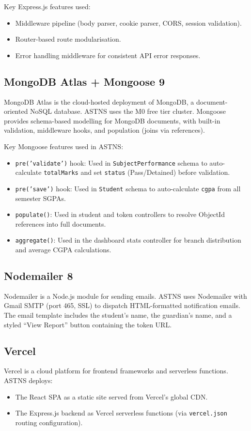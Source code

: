 \documentclass[12pt,a4paper]{report}
\begin{document}
Key Express.js features used:
\begin{itemize}
  \item Middleware pipeline (body parser, cookie parser, CORS, session validation).
  \item Router-based route modularisation.
  \item Error handling middleware for consistent API error responses.
\end{itemize}

\subsection{MongoDB Atlas + Mongoose 9}
MongoDB Atlas is the cloud-hosted deployment of MongoDB, a document-oriented NoSQL database. ASTNS uses the M0 free tier cluster. Mongoose provides schema-based modelling for MongoDB documents, with built-in validation, middleware hooks, and population (joins via references).

Key Mongoose features used in ASTNS:
\begin{itemize}
  \item \texttt{pre('validate')} hook: Used in \texttt{SubjectPerformance} schema to auto-calculate \texttt{totalMarks} and set \texttt{status} (Pass/Detained) before validation.
  \item \texttt{pre('save')} hook: Used in \texttt{Student} schema to auto-calculate \texttt{cgpa} from all semester SGPAs.
  \item \texttt{populate()}: Used in student and token controllers to resolve ObjectId references into full documents.
  \item \texttt{aggregate()}: Used in the dashboard stats controller for branch distribution and average CGPA calculations.
\end{itemize}

\subsection{Nodemailer 8}
Nodemailer is a Node.js module for sending emails. ASTNS uses Nodemailer with Gmail SMTP (port 465, SSL) to dispatch HTML-formatted notification emails. The email template includes the student's name, the guardian's name, and a styled ``View Report'' button containing the token URL.

\subsection{Vercel}
Vercel is a cloud platform for frontend frameworks and serverless functions. ASTNS deploys:
\begin{itemize}
  \item The React SPA as a static site served from Vercel's global CDN.
  \item The Express.js backend as Vercel serverless functions (via \texttt{vercel.json} routing configuration).
\end{itemize}
\end{document}
